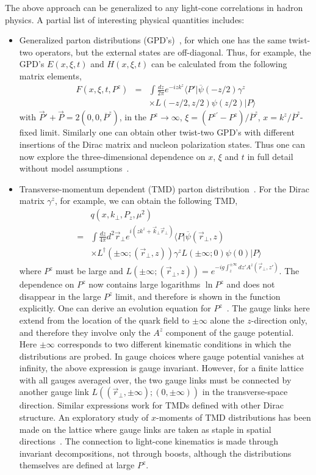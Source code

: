 The above approach can be generalized to any light-cone correlations in hadron physics.
A partial list of interesting physical quantities includes:
\begin{itemize}
\item{Generalized parton distributions (GPD's)~\cite{Ji:1996ek}, for which one has the same twist-two operators, but the external
states are off-diagonal. Thus, for example, the GPD's $E(x,\xi, t)$ and $H(x, \xi, t)$  can be calculated
from the following matrix elements,
\begin{eqnarray}
  F(x, \xi, t, P^z) &=& \int \frac{dz}{2\pi} e^{-izk^z}\langle P'|\overline\psi(-z/2)\gamma^z \\ && \times L(-z/2,z/2)\psi(z/2)|P\rangle \nonumber
\end{eqnarray}
with $\vec{P}'+\vec{P}=2(0,0,\overline{P}^z)$, in the $P^z\rightarrow \infty$, $\xi= (P^{z'}-P^z)/\overline{P}^z$, $x=k^z/\overline{P}^z$-fixed limit. Similarly one can obtain other twist-two GPD's with different insertions of the Dirac matrix and nucleon polarization states.
Thus one can now explore the three-dimensional dependence on $x$, $\xi$ and $t$ in full detail without model assumptions~\cite{Hagler:2003jd}.}

\item{Transverse-momentum dependent (TMD) parton distribution~\cite{collins}.  For the Dirac matrix $\gamma^z$, for example, we can obtain the following TMD,
\begin{eqnarray}
  && q(x,k_\perp, P_z, \mu^2)\nonumber \\ &=& \int \frac{dz}{4\pi} d^2\vec{r}_\perp e^{i(zk^z+\vec{k}_\perp \vec{r}_\perp)}  \langle P|\overline{\psi}(\vec{r}_\perp,z)
    \\ && \times L^\dagger\left(\pm\infty; (\vec{r}_\perp,z)\right)\gamma^z L(\pm\infty; 0)\psi(0) |P\rangle \nonumber
\end{eqnarray}
where $P^z$ must be large and $L\left(\pm\infty; (\vec{r}_\perp, z)\right) = e^{-ig\int^{\pm\infty}_{z} dz' A^z(\vec{r}_\perp, z')}$. The dependence
on $P^z$ now contains large logarithms $\ln P^z$ and does not disappear in the large $P^z$ limit, and therefore is shown in the function explicitly.
One can derive an evolution equation for $P^z$~\cite{collins}.
The gauge links here extend from the location of the quark field to $\pm \infty$
alone the $z$-direction only, and therefore they involve only the $A^z$ component of the gauge potential. Here $\pm\infty$ corresponds to two different kinematic
conditions in which the distributions are probed. In gauge choices where gauge potential vanishes at infinity, the above expression is gauge invariant.
However, for a finite lattice with all gauges averaged over, the two gauge links must be connected by another gauge link $L((\vec{r}_\perp, \pm\infty);(0,\pm \infty))$ in the transverse-space direction. Similar expressions work for TMDs defined with other Dirac structure. An exploratory study of $x$-moments of TMD distributions has been made on the lattice where gauge links are taken as staple in spatial directions~\cite{Musch:2010ka}. The connection to light-cone kinematics
is made through invariant decompositions, not through boosts, although the distributions themselves are defined at large $P^z$.}


\end{itemize}
